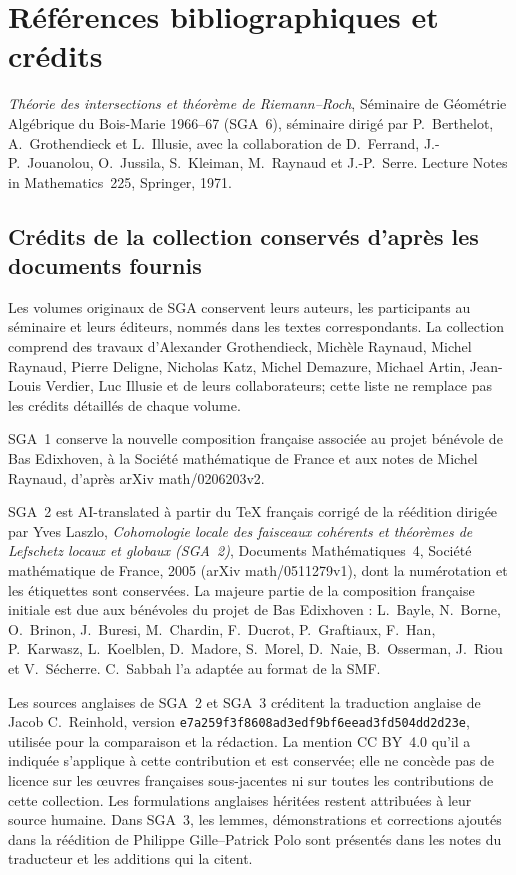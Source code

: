 \section*{Références bibliographiques et crédits}
\textit{Théorie des intersections et théorème de Riemann--Roch},
Séminaire de Géométrie Algébrique du Bois-Marie 1966--67 (SGA~6), séminaire
dirigé par P.~Berthelot, A.~Grothendieck et L.~Illusie, avec la collaboration
de D.~Ferrand, J.-P.~Jouanolou, O.~Jussila, S.~Kleiman, M.~Raynaud et
J.-P.~Serre. Lecture Notes in Mathematics~225, Springer, 1971.

\subsection*{Crédits de la collection conservés d'après les documents fournis}
Les volumes originaux de SGA conservent leurs auteurs, les participants au
séminaire et leurs éditeurs, nommés dans les textes correspondants. La
collection comprend des travaux d'Alexander Grothendieck, Michèle Raynaud,
Michel Raynaud, Pierre Deligne, Nicholas Katz, Michel Demazure, Michael Artin,
Jean-Louis Verdier, Luc Illusie et de leurs collaborateurs; cette liste ne
remplace pas les crédits détaillés de chaque volume.

SGA~1 conserve la nouvelle composition française associée au projet bénévole
de Bas Edixhoven, à la Société mathématique de France et aux notes de Michel
Raynaud, d'après arXiv math/0206203v2.

SGA~2 est AI-translated à partir du TeX français corrigé de la réédition
dirigée par Yves Laszlo, \textit{Cohomologie locale des faisceaux cohérents et
théorèmes de Lefschetz locaux et globaux (SGA~2)}, Documents Mathématiques~4,
Société mathématique de France, 2005 (arXiv math/0511279v1), dont la
numérotation et les étiquettes sont conservées. La majeure partie de la
composition française initiale est due aux bénévoles du projet de Bas
Edixhoven : L.~Bayle, N.~Borne, O.~Brinon, J.~Buresi, M.~Chardin, F.~Ducrot,
P.~Graftiaux, F.~Han, P.~Karwasz, L.~Koelblen, D.~Madore, S.~Morel, D.~Naie,
B.~Osserman, J.~Riou et V.~Sécherre. C.~Sabbah l'a adaptée au format de la SMF.

Les sources anglaises de SGA~2 et SGA~3 créditent la traduction anglaise de
Jacob C.~Reinhold, version \texttt{e7a259f3f8608ad3edf9bf6eead3fd504dd2d23e},
utilisée pour la comparaison et la rédaction. La mention CC BY~4.0 qu'il a
indiquée s'applique à cette contribution et est conservée; elle ne concède
pas de licence sur les œuvres françaises sous-jacentes ni sur toutes les
contributions de cette collection. Les formulations anglaises héritées
restent attribuées à leur source humaine. Dans SGA~3, les lemmes,
démonstrations et corrections ajoutés dans la réédition de Philippe
Gille--Patrick Polo sont présentés dans les notes du traducteur et les
additions qui la citent.


